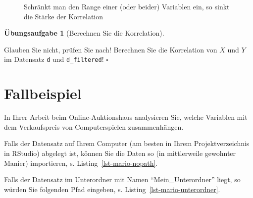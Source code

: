 \documentclass[
  letterpaper,
]{scrbook}
\newenvironment{Shaded}{\begin{snugshade}}{\end{snugshade}}
\newcommand{\FunctionTok}[1]{\textcolor[rgb]{0.28,0.35,0.67}{#1}}
\newcommand{\NormalTok}[1]{\textcolor[rgb]{0.00,0.23,0.31}{#1}}
\newcommand{\OtherTok}[1]{\textcolor[rgb]{0.00,0.23,0.31}{#1}}
\newcommand{\StringTok}[1]{\textcolor[rgb]{0.13,0.47,0.30}{#1}}
\theoremstyle{definition}
\newtheorem{exercise}{Übungsaufgabe}[chapter]
\theoremstyle{definition}
\theoremstyle{definition}
\theoremstyle{remark}
\begin{document}
\begin{figure}
\begin{minipage}{0.45\linewidth}
{}


\end{minipage}%

\caption{\label{fig-corr-range}Schränkt man den Range einer (oder
beider) Variablen ein, so sinkt die Stärke der Korrelation}

\end{figure}%

\begin{exercise}[Berechnen Sie die
Korrelation]\protect\hypertarget{exr-corr-range}{}\label{exr-corr-range}

Glauben Sie nicht, prüfen Sie nach! Berechnen Sie die Korrelation von
\(X\) und \(Y\) im Datensatz \texttt{d} und \texttt{d\_filtered}!
\(\square\)

\end{exercise}

\section{Fallbeispiel}\label{fallbeispiel}

In Ihrer Arbeit beim Online-Auktionshaus analysieren Sie, welche
Variablen mit dem Verkaufspreis von Computerspielen zusammenhängen.

Falls der Datensatz auf Ihrem Computer (am besten in Ihrem
Projektverzeichnis in RStudio) abgelegt ist, können Sie die Daten so (in
mittlerweile gewohnter Manier) importieren, s.
Listing~\ref{lst-mario-nopath}.

\begin{codelisting}

\caption{\label{lst-mario-nopath}Mariokart importieren, wenn die
CSV-Datei im aktuellen Projektordner liegt.}

\centering{

\begin{Shaded}
\begin{Highlighting}[]
\NormalTok{mariokart }\OtherTok{\textless{}{-}} \FunctionTok{read.csv}\NormalTok{(}\StringTok{"mariokart.csv"}\NormalTok{)}
\end{Highlighting}
\end{Shaded}

}

\end{codelisting}%

Falls der Datensatz im Unterordner mit Namen \enquote{Mein\_Unterordner}
liegt, so würden Sie folgenden Pfad eingeben, s.
Listing~\ref{lst-mario-unterordner}.
\end{document}
